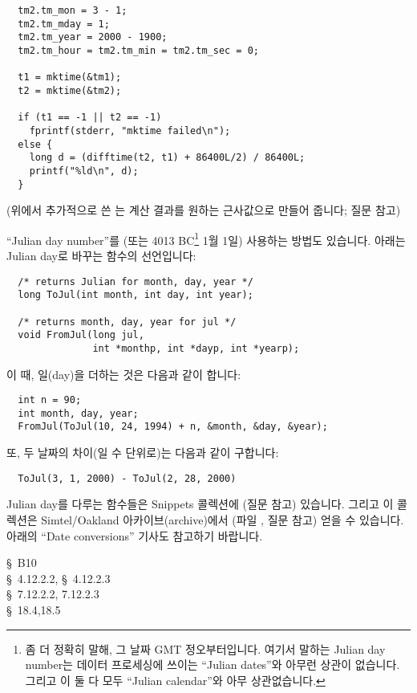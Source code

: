 \begin{faq}
\begin{verbatim}
  tm2.tm_mon = 3 - 1;
  tm2.tm_mday = 1;
  tm2.tm_year = 2000 - 1900;
  tm2.tm_hour = tm2.tm_min = tm2.tm_sec = 0;

  t1 = mktime(&tm1);
  t2 = mktime(&tm2);

  if (t1 == -1 || t2 == -1)
    fprintf(stderr, "mktime failed\n");
  else {
    long d = (difftime(t2, t1) + 86400L/2) / 86400L;
    printf("%ld\n", d);
  }
\end{verbatim}
	\noindent (위에서 추가적으로 쓴 는 계산 결과를
        원하는 근사값으로 만들어 줍니다; 질문  참고)
        
	``Julian day number''를 (또는 4013 BC\footnote{좀 더 정확히 말해,
        그 날짜 GMT 정오부터입니다. 여기서 말하는 Julian day number는
        데이터 프로세싱에 쓰이는 ``Julian dates''와 아무런 상관이 없습니다.
        그리고 이 둘 다 모두 ``Julian calendar''와 아무 상관없습니다.} 1월 1일)
        사용하는 방법도 있습니다. 아래는 Julian day로 바꾸는 함수의 선언입니다:
\begin{verbatim}
  /* returns Julian for month, day, year */
  long ToJul(int month, int day, int year);

  /* returns month, day, year for jul */
  void FromJul(long jul, 
               int *monthp, int *dayp, int *yearp);
\end{verbatim}
	\noindent 이 때, 일(day)을 더하는 것은 다음과 같이 합니다:
\begin{verbatim}
  int n = 90;
  int month, day, year;
  FromJul(ToJul(10, 24, 1994) + n, &month, &day, &year);
\end{verbatim}
	\noindent 또, 두 날짜의 차이(일 수 단위로)는 다음과 같이 구합니다:
\begin{verbatim}
  ToJul(3, 1, 2000) - ToJul(2, 28, 2000)
\end{verbatim}
	Julian day를 다루는 함수들은 Snippets 콜렉션에 (질문  참고)
	있습니다.  그리고 이 콜렉션은 Simtel/Oakland 아카이브(archive)에서
	(파일 , 질문  참고) 얻을 수 있습니다.
	아래의 ``Date conversions'' 기사도 참고하기 바랍니다.

\R
	\cite{kr2} \S\ B10  \\
        \cite{ansi} \S\ 4.12.2.2, \S\ 4.12.2.3 \\
	\cite{c89} \S\ 7.12.2.2, 7.12.2.3 \\
	\cite{hs} \S\ 18.4,18.5  \\
	\cite{dateconv}
\end{faq}

